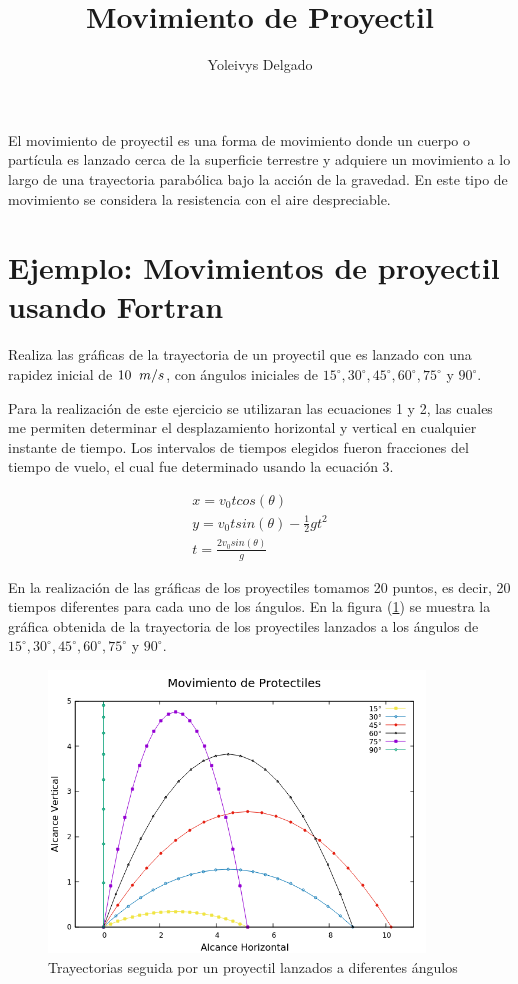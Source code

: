 \documentclass[12pt,a4paper,twoside]{article}
\author{Yoleivys Delgado}
\title{\textbf{Movimiento de Proyectil}}
\begin{document}
\maketitle
El movimiento de proyectil es una forma de movimiento donde un cuerpo o partícula es lanzado cerca de la superficie terrestre y adquiere un movimiento a lo largo de una trayectoria parabólica bajo la acción de la gravedad. En este tipo de movimiento se considera la resistencia con el aire despreciable.

\section*{Ejemplo: Movimientos de proyectil usando Fortran}
Realiza las gráficas de la trayectoria de un proyectil que es lanzado con una rapidez inicial de $10\hspace{0.2cm}m/s$, con ángulos iniciales de $ 15^{\circ}, 30^{\circ}, 45^{\circ}, 60^{\circ}, 75^{\circ}$  y $ 90^{\circ}$.
\vspace{0.5cm}

Para la realización de este ejercicio se utilizaran las  ecuaciones 1 y 2, las cuales me permiten determinar el desplazamiento horizontal y vertical en cualquier instante de tiempo. Los intervalos de tiempos elegidos fueron fracciones del tiempo de vuelo, el cual fue determinado usando la ecuación 3. 

\begin{eqnarray}
x = v_{0} t cos (\theta)\\
y = v_{0} t sin (\theta) - \frac{1}{2} g t^2\\
t = \frac{2v_{0}sin (\theta)}{g}
\end{eqnarray}

En la realización de las gráficas de los proyectiles tomamos 20 puntos, es decir, 20 tiempos diferentes para cada uno de los ángulos. En la figura (\ref{fig:figura1}) se muestra la gráfica obtenida de la trayectoria de los proyectiles lanzados a los ángulos de $ 15^{\circ}, 30^{\circ}, 45^{\circ}, 60^{\circ}, 75^{\circ}$  y $ 90^{\circ}$.
\newpage   
\begin{figure}[h]
\centering
\includegraphics[width=10cm]{proyectiles.png} 
\caption{Trayectorias seguida por un proyectil lanzados a diferentes ángulos}
\label{fig:figura1}
\end{figure}
\end{document}
